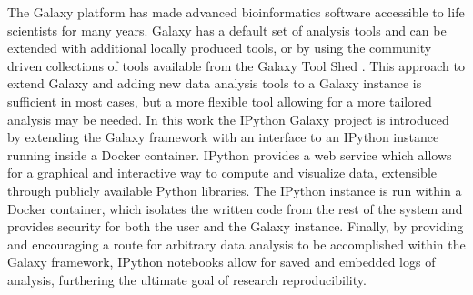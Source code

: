 \documentclass{bioinfo}
\begin{document}
The Galaxy platform \citep{Blank2010,Giardine2005,Goecks2010} has made advanced bioinformatics software accessible
to life scientists for many years. Galaxy has a default set of analysis tools and can be extended with additional locally produced tools, or by using the community driven collections of tools available from the Galaxy Tool Shed
\citep{Blankenberg2014}. This approach to extend Galaxy and adding new data analysis tools to a Galaxy instance is sufficient
in most cases, but a more flexible tool allowing for a more tailored analysis may be needed.
In this work the IPython Galaxy project is introduced by extending the Galaxy framework with an interface to an
IPython \citep{Perez2007} instance running inside a Docker container.
IPython provides a web service which allows for a graphical and interactive way to compute and visualize data, 
extensible through publicly available Python libraries. The IPython instance is run within a Docker container, 
which isolates the written code from the rest of the system and provides security for both the user and the Galaxy instance. Finally, by providing and encouraging a route for arbitrary data analysis to be accomplished within the Galaxy framework, 
IPython notebooks allow for saved and embedded logs of analysis, furthering the ultimate goal of research reproducibility.
\end{document}
